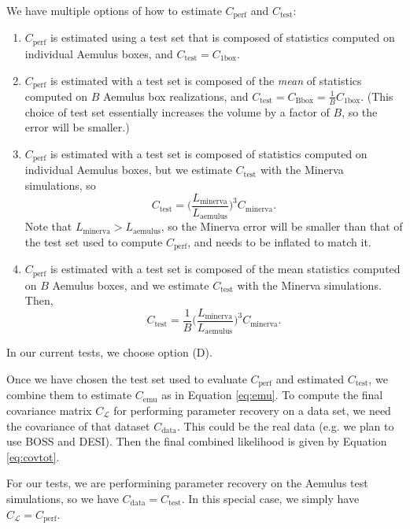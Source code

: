 \documentclass[12pt]{article}
\newcommand{\like}{\mathcal{L}}
\newcommand{\cov}[1]{C_\text{#1}}
\newcommand{\covtot}{C_\like}
\begin{document}
We have multiple options of how to estimate $\cov{perf}$ and $\cov{test}$: 
\begin{enumerate}[label=(\Alph*)]
    \item $\cov{perf}$ is estimated using a test set that is composed of statistics computed on individual Aemulus boxes, and $\cov{test} = \cov{1box}$.

    \item $\cov{perf}$ is estimated with a test set is composed of the \emph{mean} of statistics computed on $B$ Aemulus box realizations, and $\cov{test} = \cov{Bbox} = \frac{1}{B}\cov{1box}$. 
    (This choice of test set essentially increases the volume by a factor of $B$, so the error will be smaller.)

    \item $\cov{perf}$ is estimated with a test set is composed of statistics computed on individual Aemulus boxes, but we estimate $\cov{test}$ with the Minerva simulations, so 
    \begin{equation}
        \cov{test} = \bigg( \frac{L_\text{minerva} }{ L_\text{aemulus}} \bigg)^3  \cov{minerva}.
    \end{equation}
    Note that $L_\text{minerva} > L_\text{aemulus}$, so the Minerva error will be smaller than that of the test set used to compute $\cov{perf}$, and needs to be inflated to match it.
    
    \item $\cov{perf}$ is estimated with a test set is composed of the mean statistics computed on $B$ Aemulus boxes, and we estimate $\cov{test}$ with the Minerva simulations. Then,
    \begin{equation}
        \cov{test} =  \frac{1}{B}\bigg( \frac{L_\text{minerva} }{ L_\text{aemulus}} \bigg)^3  \cov{minerva}.
        \end{equation}

\end{enumerate}
In our current tests, we choose option (D). 

Once we have chosen the test set used to evaluate $\cov{perf}$ and estimated $\cov{test}$, we combine them to estimate $\cov{emu}$ as in Equation \ref{eq:emu}.
To compute the final covariance matrix $\covtot$ for performing parameter recovery on a data set, we need the covariance of that dataset $\cov{data}$.
This could be the real data (e.g. we plan to use BOSS and DESI). Then the final combined likelihood is given by Equation \ref{eq:covtot}.

For our tests, we are performining parameter recovery on the Aemulus test simulations, so we have $\cov{data} = \cov{test}$. 
In this special case, we simply have $\covtot = \cov{perf}$. 
\end{document}
